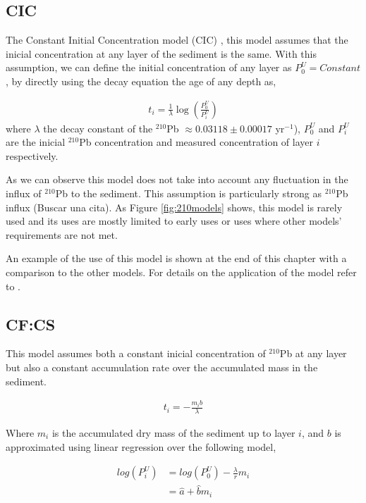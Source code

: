 \documentclass [10pt] {article}
\begin{document}
\subsection{CIC}

The Constant Initial Concentration model (CIC) \citep{Goldberg1963,Crozaz1964,Robbins1978}, this model assumes that the inicial concentration at any layer of the sediment is the same. 
With this assumption, we can define the initial concentration of any layer as $P_0^U = Constant$, by directly using the decay equation the age of any depth as,

\begin{eqnarray}
	t_i = \frac{1}{\lambda}\log \left( \frac{P_0^U}{P_i^U}\right)
\end{eqnarray}
where $\lambda$ the decay constant of the $^{210}$Pb $\approx 0.03118\pm 0.00017$ yr$^{-1}$), $P_0^U$ and $P_i^U$ are the inicial $^{210}$Pb concentration and measured concentration of layer $i$ respectively. 

As we can observe this model does not take into account any fluctuation in the influx of $^{210}$Pb to the sediment. 
This assumption is particularly strong as $^{210}$Pb influx (Buscar una cita).
As Figure \ref{fig:210models} shows, this model is rarely used and its uses are mostly limited to early uses or uses where other models' requirements are not met.

An example of the use of this model is shown at the end of this chapter with a comparison to the other models. For details on the application of the model refer to \citet{Sanchez-Cabeza2012}.


\subsection{CF:CS}

This model assumes both a constant inicial concentration of $^{210}$Pb at any layer but also a constant accumulation rate over the accumulated mass in the sediment.  

\begin{eqnarray}
	t_i = -\frac{m_i b}{\lambda}
\end{eqnarray}

Where $m_i$ is the accumulated dry mass of the sediment up to layer $i$, and $b$ is approximated using linear regression over the following model,

\begin{eqnarray}
	log(P_i^U) &= log(P_0^U) - \frac{\lambda}{r}m_i \\
		   &= \hat{a} + \hat{b}m_i
\end{eqnarray}
\end{document}
